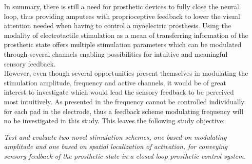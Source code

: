 

In summary, there is still a need for prosthetic devices to fully close the neural loop, thus providing amputees with proprioceptive feedback to lower the visual attention needed when having to control a myoelectric prosthesis. Using the modality of electrotactile stimulation as a mean of transferring information of the prosthetic state offers multiple stimulation parameters which can be modulated through several channels enabling possibilities for intuitive and meaningful sensory feedback. \\
However, even though several opportunities present themselves in modulating the stimulation amplitude, frequency and active channels, it would be of great interest to investigate which would lead the sensory feedback to be perceived most intuitively. As presented in  the frequency cannot be controlled individually for each pad in the electrode, thus a feedback scheme modulating frequency will no be investigated in this study. This leaves the following study objective: 

\begin{center}
	\textit{Test and evaluate two novel stimulation schemes, one based on modulating amplitude and one based on spatial localization of activation, for conveying sensory feedback of the prosthetic state in a closed loop prosthetic control system.}  
\end{center} 